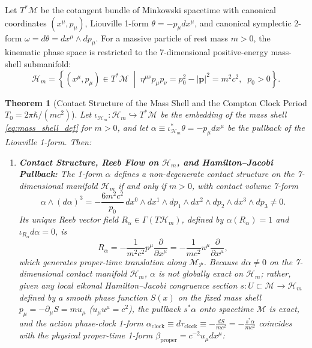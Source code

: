 \documentclass[11pt, a4paper]{article}
\newtheorem{theorem}{Theorem}[section]
\theoremstyle{definition}
\begin{document}
Let $T^*\mathcal{M}$ be the cotangent bundle of Minkowski spacetime with canonical coordinates $(x^\mu, p_\mu)$, Liouville 1-form $\theta = -p_\mu dx^\mu$, and canonical symplectic 2-form $\omega = d\theta = dx^\mu \wedge dp_\mu$. For a massive particle of rest mass $m > 0$, the kinematic phase space is restricted to the 7-dimensional positive-energy mass-shell submanifold:
\begin{equation}
\label{eq:mass_shell_def}
\mathcal{H}_m = \left\{ (x^\mu, p_\mu) \in T^*\mathcal{M} \;\middle|\; \eta^{\mu\nu}p_\mu p_\nu = p_0^2 - |\mathbf{p}|^2 = m^2 c^2, \;\; p_0 > 0 \right\}.
\end{equation}

\begin{theorem}[Contact Structure of the Mass Shell and the Compton Clock Period $T_0 = 2\pi\hbar / (mc^2)$]
\label{thm:contact_period}
Let $\iota_{\mathcal{H}_m}: \mathcal{H}_m \hookrightarrow T^*\mathcal{M}$ be the embedding of the mass shell \eqref{eq:mass_shell_def} for $m > 0$, and let $\alpha \equiv \iota_{\mathcal{H}_m}^* \theta = -p_\mu dx^\mu$ be the pullback of the Liouville 1-form. Then:
\begin{enumerate}[label=(\roman*)]
    \item \textbf{Contact Structure, Reeb Flow on $\mathcal{H}_m$, and Hamilton--Jacobi Pullback:} The 1-form $\alpha$ defines a non-degenerate contact structure on the 7-dimensional manifold $\mathcal{H}_m$ if and only if $m > 0$, with contact volume 7-form
    \begin{equation}
    \label{eq:contact_volume}
    \alpha \wedge (d\alpha)^3 = -\frac{6 m^2 c^2}{p_0} \, dx^0 \wedge dx^1 \wedge dp_1 \wedge dx^2 \wedge dp_2 \wedge dx^3 \wedge dp_3 \neq 0.
    \end{equation}
    Its unique Reeb vector field $R_\alpha \in \Gamma(T\mathcal{H}_m)$, defined by $\alpha(R_\alpha) = 1$ and $\iota_{R_\alpha} d\alpha = 0$, is
    \begin{equation}
    \label{eq:reeb_vector}
    R_\alpha = -\frac{1}{m^2 c^2} p^\mu \frac{\partial}{\partial x^\mu} = -\frac{1}{m c^2} u^\mu \frac{\partial}{\partial x^\mu},
    \end{equation}
    which generates proper-time translation along $\mathcal{M}_{\mathcal{P}}$. Because $d\alpha \neq 0$ on the 7-dimensional contact manifold $\mathcal{H}_m$, $\alpha$ is not globally exact on $\mathcal{H}_m$; rather, given any local eikonal Hamilton--Jacobi congruence section $s: U \subset \mathcal{M} \to \mathcal{H}_m$ defined by a smooth phase function $S(x)$ on the fixed mass shell $p_\mu = -\partial_\mu S = m u_\mu$ ($u_\mu u^\mu = c^2$), the pullback $s^*\alpha$ onto spacetime $\mathcal{M}$ is exact, and the action phase-clock 1-form $\alpha_{\text{clock}} \equiv d\tau_{\text{clock}} \equiv -\frac{dS}{mc^2} = -\frac{s^*\alpha}{mc^2}$ coincides with the physical proper-time 1-form $\beta_{\text{proper}} = c^{-2}u_\mu dx^\mu$:

\end{enumerate}
\end{theorem}
\end{document}
